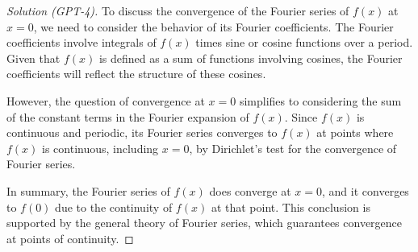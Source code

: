 \documentclass[10pt,a4paper]{amsart}
\begin{document}
\begin{proof}[Solution (GPT-4)]
  To discuss the convergence of the Fourier series of \(f(x)\) at \(x = 0\), we need to consider the behavior of its Fourier coefficients. The Fourier coefficients involve integrals of \(f(x)\) times sine or cosine functions over a period. Given that \(f(x)\) is defined as a sum of functions involving cosines, the Fourier coefficients will reflect the structure of these cosines.
  
  However, the question of convergence at \(x = 0\) simplifies to considering the sum of the constant terms in the Fourier expansion of \(f(x)\). Since \(f(x)\) is continuous and periodic, its Fourier series converges to \(f(x)\) at points where \(f(x)\) is continuous, including \(x = 0\), by Dirichlet's test for the convergence of Fourier series.
  
  In summary, the Fourier series of \(f(x)\) does converge at \(x = 0\), and it converges to \(f(0)\) due to the continuity of \(f(x)\) at that point. This conclusion is supported by the general theory of Fourier series, which guarantees convergence at points of continuity.
\end{proof}
\end{document}
